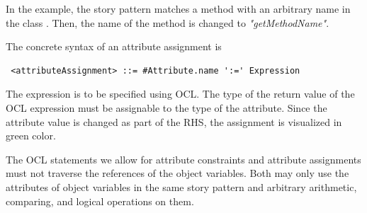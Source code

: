 In the example, the story pattern matches a method with an arbitrary name in the class . 
Then, the name of the method is changed to \emph{"getMethodName"}. 

The concrete syntax of an attribute assignment is
\begin{lstlisting}
 <attributeAssignment> ::= #Attribute.name ':=' Expression
\end{lstlisting}
The expression is to be specified using OCL. 
The type of the return value of the OCL expression must be assignable to the type of the attribute. 
Since the attribute value is changed as part of the RHS, the assignment is visualized in green color.

The OCL statements we allow for attribute constraints and attribute assignments must not traverse the references of the object variables.
Both may only use the attributes of object variables in the same story pattern and arbitrary arithmetic, comparing, and logical operations on them. 


